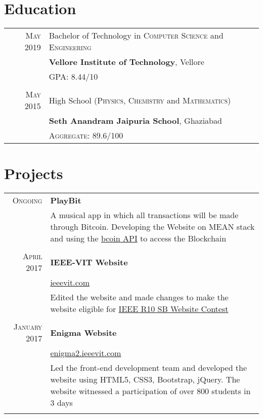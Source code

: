 \documentclass[a4paper,1pt]{article}
\begin{document}
\section{Education}
\begin{tabular}{rl}	
 \textsc{May} 2019 & Bachelor of Technology in \textsc{Computer Science} and \textsc{Engineering}\\& \textbf{Vellore Institute of Technology}, Vellore\\&
 \normalsize \textsc{GPA}: 8.44/10\\&\\
\textsc{May} 2015& High School (\textsc{Physics}, \textsc{Chemistry} and \textsc{Mathematics})\\&
\normalsize\textbf{Seth Anandram Jaipuria School}, Ghaziabad
\\&\normalsize \textsc{Aggregate}: 89.6/100\\
\end{tabular}

\section{Projects}
\begin{tabular}{r|p{11cm}}

\textsc{Ongoing} & \textbf{PlayBit} \\&\footnotesize{A musical app in which all transactions will be made through Bitcoin. Developing the Website on MEAN stack and using the \href{http://bcoin.io/}{bcoin API} to access the Blockchain}\\\multicolumn{2}{c}{}\\
\textsc{April 2017} & \textbf{IEEE-VIT Website} \\&\href{https://ieeevit.com}{ieeevit.com}\\&\footnotesize{Edited the website and made changes to make the website eligible for \href{http://sac.ieeer10.org/website-contest/}{IEEE R10 SB Website Contest}}\\\multicolumn{2}{c}{} \\
 \textsc{January 2017} & \textbf{Enigma Website} \\&\href{http://enigma2.ieeevit.com/}{enigma2.ieeevit.com}\\&\footnotesize{Led the front-end development team and developed the website using HTML5, CSS3, Bootstrap, jQuery. The website witnessed a participation of over 800 students in 3 days}\\\multicolumn{2}{c}{} 

\end{tabular}
\end{document}
